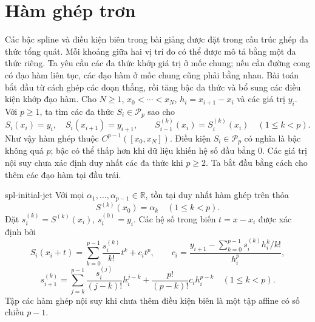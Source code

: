 \documentclass[12pt,a4paper,oneside]{book}
\numberwithin{algorithm}{chapter}
\theoremstyle{definition}
\newcommand{\R}{\mathbb{R}}
\begin{document}
\section{Hàm ghép trơn}
Các bậc spline và điều kiện biên trong bài giảng \cite{spline-slides} được đặt trong cấu trúc ghép đa thức tổng quát.
Mỗi khoảng giữa hai vị trí đo có thể được mô tả bằng một đa thức riêng. Ta yêu cầu các đa thức khớp giá trị ở mốc chung; nếu cần đường cong có đạo hàm liên tục, các đạo hàm ở mốc chung cũng phải bằng nhau. Bài toán bắt đầu từ cách ghép các đoạn thẳng, rồi tăng bậc đa thức và bổ sung các điều kiện khớp đạo hàm.
Cho $N\geq1$, $x_0<\cdots<x_N$, $h_i=x_{i+1}-x_i$ và các giá trị $y_i$.
Với $p\geq1$, ta tìm các đa thức $S_i\in\mathcal P_p$ sao cho
\[
 S_i(x_i)=y_i,\quad S_i(x_{i+1})=y_{i+1},\qquad
 S_{i-1}^{(k)}(x_i)=S_i^{(k)}(x_i)\quad(1\leq k<p).
\]
Như vậy hàm ghép thuộc $C^{p-1}([x_0,x_N])$. Điều kiện $S_i\in\mathcal P_p$ có nghĩa là bậc không quá $p$; bậc có thể thấp hơn khi dữ liệu khiến hệ số đầu bằng $0$.
Các giá trị nội suy chưa xác định duy nhất các đa thức khi $p\geq2$. Ta bắt đầu bằng cách cho thêm các đạo hàm tại đầu trái.
\begin{dinhly}{}{spl-initial-jet}
Với mọi $\alpha_1,\ldots,\alpha_{p-1}\in\R$, tồn tại duy nhất hàm ghép trên thỏa
\[
 S^{(k)}(x_0)=\alpha_k\quad(1\leq k<p).
\]
Đặt $s_i^{(k)}=S^{(k)}(x_i)$, $s_i^{(0)}=y_i$. Các hệ số trong biến $t=x-x_i$ được xác định bởi
\begin{equation}\label{eq:spl-initial-jet-coefficients}
 S_i(x_i+t)=\sum_{k=0}^{p-1}\frac{s_i^{(k)}}{k!}t^k+c_it^p,
 \qquad c_i=\frac{y_{i+1}-\sum_{k=0}^{p-1}s_i^{(k)}h_i^k/k!}{h_i^p},
\end{equation}
\begin{equation}\label{eq:spl-initial-jet-propagation}
 s_{i+1}^{(k)}=\sum_{j=k}^{p-1}\frac{s_i^{(j)}}{(j-k)!}h_i^{j-k}
 +\frac{p!}{(p-k)!}c_ih_i^{p-k}\quad(1\leq k<p).
\end{equation}
Tập các hàm ghép nội suy khi chưa thêm điều kiện biên là một tập affine có số chiều $p-1$.
\end{dinhly}
\end{document}
